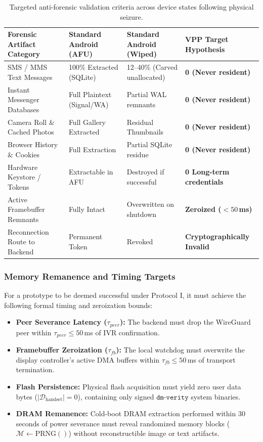 \begin{table}[h!]
\centering
\small
\begin{tabularx}{\textwidth}{lXXX}
\toprule
\textbf{Forensic Artifact Category} & \textbf{Standard Android (AFU)} & \textbf{Standard Android (Wiped)} & \textbf{VPP Target Hypothesis} \\
\midrule
SMS / MMS Text Messages & 100\% Extracted (SQLite) & 12--40\% (Carved unallocated) & \textbf{0 (Never resident)} \\
Instant Messenger Databases & Full Plaintext (Signal/WA) & Partial WAL remnants & \textbf{0 (Never resident)} \\
Camera Roll \& Cached Photos & Full Gallery Extracted & Residual Thumbnails & \textbf{0 (Never resident)} \\
Browser History \& Cookies & Full Extraction & Partial SQLite residue & \textbf{0 (Never resident)} \\
Hardware Keystore / Tokens & Extractable in AFU & Destroyed if successful & \textbf{0 Long-term credentials} \\
Active Framebuffer Remnants & Fully Intact & Overwritten on shutdown & \textbf{Zeroized ($<50$\,ms)} \\
Reconnection Route to Backend & Permanent Token & Revoked & \textbf{Cryptographically Invalid} \\
\bottomrule
\end{tabularx}
\caption{Targeted anti-forensic validation criteria across device states following physical seizure.}
\label{tab:forensic_results}
\end{table}

\subsubsection{Memory Remanence and Timing Targets}
For a prototype to be deemed successful under Protocol I, it must achieve the following formal timing and zeroization bounds:
\begin{itemize}
    \item \textbf{Peer Severance Latency ($\tau_{peer}$):} The backend must drop the WireGuard peer within $\tau_{peer} \le 50$\,ms of IVR confirmation.
    \item \textbf{Framebuffer Zeroization ($\tau_{fb}$):} The local watchdog must overwrite the display controller's active DMA buffers within $\tau_{fb} \le 50$\,ms of transport termination.
    \item \textbf{Flash Persistence:} Physical flash acquisition must yield zero user data bytes ($|\mathcal{D}_{\text{handset}}| = 0$), containing only signed $\texttt{dm-verity}$ system binaries.
    \item \textbf{DRAM Remanence:} Cold-boot DRAM extraction performed within 30 seconds of power severance must reveal randomized memory blocks ($\mathcal{M} \leftarrow \text{PRNG}()$) without reconstructible image or text artifacts.
\end{itemize}

